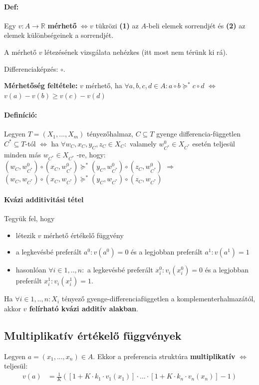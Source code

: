 \documentclass[a4paper,12pt]{article}
\begin{document}
\paragraph{Def:} Egy $v: A \rightarrow \mathbb{R}$ \textbf{mérhető} $\Leftrightarrow v$ tükrözi \textbf{(1)} az $A$-beli elemek sorrendjét és \textbf{(2)} az elemek különbségeinek a sorrendjét. 

A mérhető $v$ létezésének vizsgálata nehézkes (itt most nem térünk ki rá).

Differenciaképzés: $\circ$.

\textbf{Mérhetőség feltétele:} $v$ mérhető, ha $\forall a,b,c,d \in A: a \circ b \succeq^* c \circ d$ $\Leftrightarrow$ $v(a)-v(b) \geq v(c)-v(d)$ 
 
 
\paragraph{Definíció: } Legyen $T=(X_1,...,X_m)$ tényezőhalmaz, $C \subseteq T$ gyenge differencia-független $C^*\subseteq T $-tól $\Leftrightarrow$ ha $\forall w_C,x_C,y_C,z_C \in X_C:$ valamely $w_{C^*}^0 \in X_{C^*}$ esetén teljesül minden más $w_{C^*} \in X_{C^*}$ -re, hogy: $(w_C, w_{C^*}^0) \circ (x_C, w_{C^*}^0) \succeq^* (y_C, w_{C^*}^0) \circ (z_C, w_{C^*}^0)$  $\Rightarrow$ $(w_C, w_{C^*}) \circ (x_C, w_{C^*}) \succeq^* (y_C, w_{C^*}) \circ (z_C, w_{C^*})$ 

\paragraph{Kvázi additivitási tétel} Tegyük fel, hogy
\begin{itemize}
\item létezik $v$ mérhető értékelő függvény
\item a legkevésbé preferált $a^0: v(a^0) = 0$ és a legjobban preferált $a^1: v(a^1)=1$
\item hasonlóan $\forall i \in 1,..,n : $ a legkevésbé preferált $x_i^0: v_i(x_i^0) = 0$ és a legjobban preferált $x_i^1: v_i(x_i^1)=1$.
\end{itemize}
Ha $\forall i \in 1,..,n : X_i$ tényező gyenge-differenciafüggetlen a komplementerhalmazától, akkor \textbf{$v$ felírható kvázi additív alakban}.

\subsection{Multiplikatív értékelő függvények}
Legyen $a=(x_1, ... , x_n) \in A$. Ekkor a preferencia struktúra \textbf{multiplikatív} $\Leftrightarrow$ teljesül:
\begin{equation}
\begin{split}
v(a)  & = \frac{1}{K}([1+K\cdot k_{1}\cdot  v_1(x_1)]\cdot ...\cdot [1+K\cdot k_{n}\cdot  v_n(x_n)] - 1)
\end{split}
\end{equation}
\end{document}
